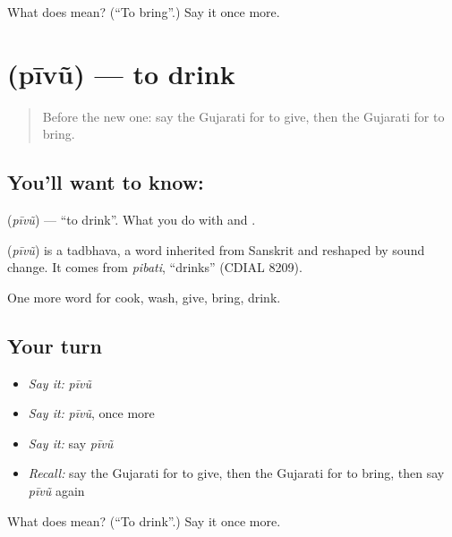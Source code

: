 \begin{tcolorbox}[breakable,colback=teal!4,colframe=teal!35!black,title={Before you move on}]
What does  mean? (\textquotedblleft{}To bring\textquotedblright{}.) Say it once more.
\end{tcolorbox}
\section[\texorpdfstring{\gu{પીવું} (pīvũ)}{પીવું (pīvũ)}]{ (pīvũ) — to drink}

\label{lesson:GU-C55-pivu}



\begin{quote}
Before the new one: say the Gujarati for to give, then the Gujarati for to bring.
\end{quote}

\subsection*{You'll want to know: }
\textbf{} (\emph{pīvũ}) — \textquotedblleft{}to drink\textquotedblright{}. What you do with \textbf{} and \textbf{}.

\begin{cousinweb}
\textbf{} (\emph{pīvũ}) is a tadbhava, a word inherited from Sanskrit and reshaped by sound change. It comes from \emph{pibati}, \textquotedblleft{}drinks\textquotedblright{} (CDIAL 8209).
\end{cousinweb}

\begin{grammarlens}[title={What you've built}]
One more word for cook, wash, give, bring, drink.
\end{grammarlens}

\subsection*{Your turn}
\begin{itemize}
\raggedright
  \item \emph{Say it:} \emph{pīvũ}
  \item \emph{Say it:} \emph{pīvũ}, once more
  \item \emph{Say it:} say \emph{pīvũ}
  \item \emph{Recall:} say the Gujarati for to give, then the Gujarati for to bring, then say \emph{pīvũ} again
\end{itemize}

\begin{tcolorbox}[breakable,colback=teal!4,colframe=teal!35!black,title={Before you move on}]
What does  mean? (\textquotedblleft{}To drink\textquotedblright{}.) Say it once more.
\end{tcolorbox}
